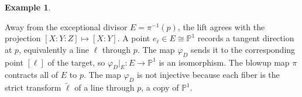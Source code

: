 \documentclass[11pt]{article}
\theoremstyle{definition}
\newtheorem{Ex}{Example}
\newcommand{\bP}{\mathbb{P}}
\newcommand{\vf}{\varphi}
\begin{document}
\begin{Ex}
\begin{center}
    \end{center}
    Away from the exceptional divisor \(E=\pi^{-1}(p)\), the lift
    agrees with the projection \([X:Y:Z]\mapsto[X:Y]\).
    A point \(e_\ell\in E\cong\bP^1\) records a tangent direction at
    \(p\), equivalently a line \(\ell\) through \(p\). The map
    \(\vf_D\) sends it to the corresponding point \([\ell]\) of the
    target, so \(\vf_D|_E:E\to\bP^1\) is an isomorphism.
    The blowup map \(\pi\) contracts all of \(E\) to \(p\).
    The map \(\vf_D\) is not injective because each fiber is the strict
    transform \(\widetilde{\ell}\) of a line through \(p\), a copy of
    \(\bP^1\).
\end{Ex}
\end{document}
